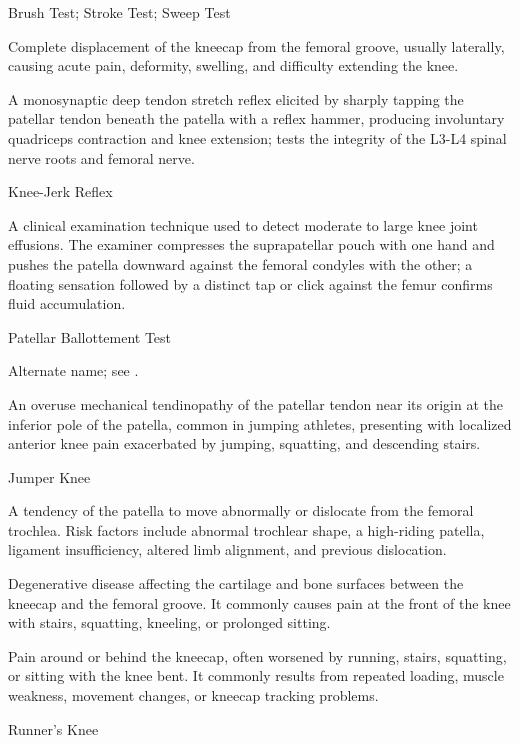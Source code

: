 \synonyms
Brush Test; Stroke Test; Sweep Test

 Complete displacement of the kneecap from the femoral groove, usually laterally, causing acute pain, deformity, swelling, and difficulty extending the knee.

 A monosynaptic deep tendon stretch reflex elicited by sharply tapping the patellar tendon beneath the patella with a reflex hammer, producing involuntary quadriceps contraction and knee extension; tests the integrity of the L3-L4 spinal nerve roots and femoral nerve.

\synonyms
Knee-Jerk Reflex

 A clinical examination technique used to detect moderate to large knee joint effusions. The examiner compresses the suprapatellar pouch with one hand and pushes the patella downward against the femoral condyles with the other; a floating sensation followed by a distinct tap or click against the femur confirms fluid accumulation.

\synonyms
Patellar Ballottement Test

 Alternate name; see .

 An overuse mechanical tendinopathy of the patellar tendon near its origin at the inferior pole of the patella, common in jumping athletes, presenting with localized anterior knee pain exacerbated by jumping, squatting, and descending stairs.

\synonyms
Jumper Knee

 A tendency of the patella to move abnormally or dislocate from the femoral trochlea.
Risk factors include abnormal trochlear shape, a high-riding patella, ligament insufficiency,
altered limb alignment, and previous dislocation.

 Degenerative disease affecting the cartilage and bone surfaces between the kneecap and the femoral groove. It commonly causes pain at the front of the knee with stairs, squatting, kneeling, or prolonged sitting.

 Pain around or behind the kneecap, often worsened by running, stairs, squatting, or sitting with the knee bent. It commonly results from repeated loading, muscle weakness, movement changes, or kneecap tracking problems.

\synonyms
Runner's Knee


